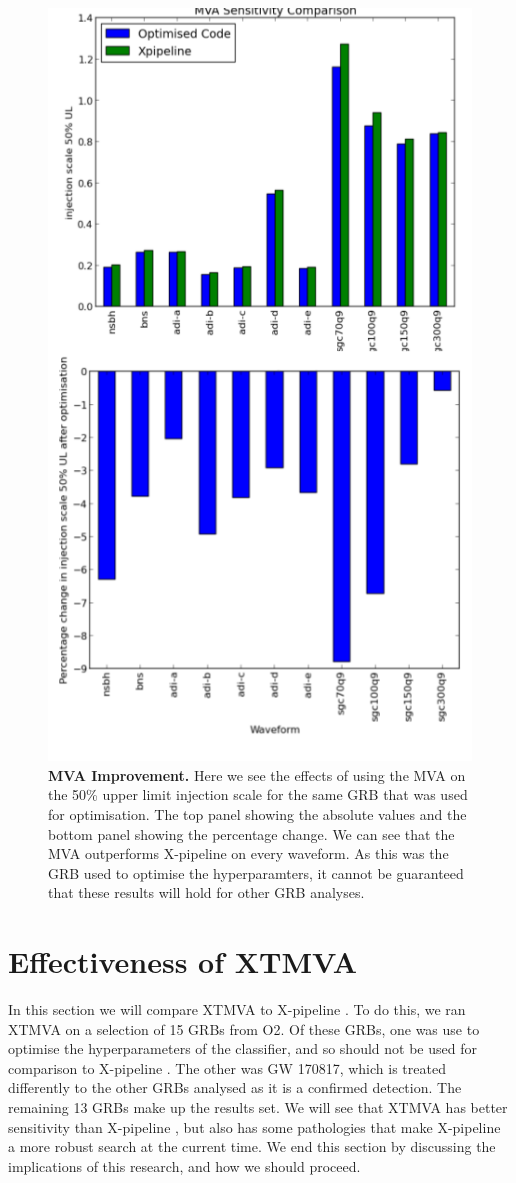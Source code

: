 \documentclass[11pt]{cuthesis}
\newcommand{\xp}{X-pipeline }
\begin{document}
\begin{figure} %
\begin{center}
\includegraphics[width=0.8\linewidth]{x_compare.png}
\end{center}
\caption{\textbf{MVA Improvement.} Here we see the effects of using the MVA on the 50\% upper limit injection scale for the same GRB that was used for optimisation. The top panel showing the absolute values and the bottom panel showing the percentage change. We can see that the MVA outperforms \xp on every waveform. As this was the GRB used to optimise the hyperparamters, it cannot be guaranteed that these results will hold for other GRB analyses. }
\label{fig:x compare}
\end{figure}

\section{Effectiveness of XTMVA}
In this section we will compare XTMVA to \xp. To do this, we ran XTMVA on a selection of 15 GRBs from O2. Of these GRBs, one was use to optimise the hyperparameters of the classifier, and so should not be used for comparison to \xp. The other was GW 170817, which is treated differently to the other GRBs analysed as it is a confirmed detection. The remaining 13 GRBs make up the results set. We will see that XTMVA has better sensitivity than \xp, but also has some pathologies that make \xp a more robust search at the current time. We end this section by discussing the implications of this research, and how we should proceed. 
\end{document}
